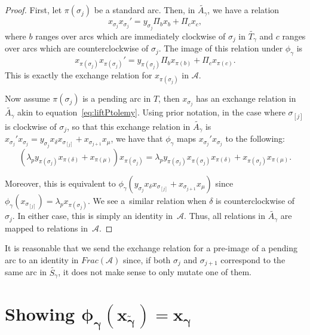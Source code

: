 \documentclass[pdftex]{sigma}%
\numberwithin{equation}{section}
\begin{document}
\begin{proof}
First, let $\pi(\sigma_j)$ be a standard arc. Then, in $\widetilde{A_\gamma}$, we have a relation \begin{equation}\label{eq:liftPtolemy}
x_{\sigma_j}x_{\sigma_j}' = y_{\sigma_j} \Pi_b x_b + \Pi_c x_c, \end{equation} where $b$ ranges over arcs which are immediately clockwise of $\sigma_j$ in $\widetilde{T_\gamma}$ and $c$ ranges over arcs which are counterclockwise of $\sigma_j$. The image of this relation under $\phi_\gamma$ is \begin{equation}
x_{\pi(\sigma_j)}x_{\pi(\sigma_j)}' = y_{\pi(\sigma_j)}\Pi_b x_{\pi(b)} + \Pi_c x_{\pi(c)}.\end{equation} This is exactly the exchange relation for $x_{\pi(\sigma_j)}$ in $\mathcal{A}$.

 Now assume $\pi(\sigma_j)$ is a pending arc in $T$, then $x_{\sigma_j}$ has an exchange relation in $\widetilde{A_\gamma}$ akin to equation~\eqref{eq:liftPtolemy}. Using prior notation, in the case where $\sigma_{[j]}$ is clockwise of $\sigma_j$, so that this exchange relation in $\widetilde{A_\gamma}$ is $x_{\sigma_j}' x_{\sigma_j} = y_{\sigma_j} x_\delta x_{\sigma_{[j]}} + x_{\sigma_{j+1}} x_\mu$, we have that $\phi_\gamma$ maps $x_{\sigma_j}' x_{\sigma_j} $ to the following:\[
 ( \lambda_p y_{\pi(\sigma_j)} x_{\pi(\delta)} + x_{\pi(\mu)}) x_{\pi(\sigma_j)}= \lambda_p y_{\pi(\sigma_j)} x_{\pi(\sigma_j)}x_{\pi(\delta)} + x_{\pi(\sigma_j)} x_{\pi(\mu)}.
\]

Moreover, this is equivalent to $\phi_\gamma( y_{\sigma_j} x_\delta x_{\sigma_{[j]}} + x_{\sigma_{j+1}} x_\mu)$ since $\phi_\gamma(x_{\sigma_{[j]}}) = \lambda_p x_{\pi(\sigma_j)}$.
We see a~similar relation when $\delta$ is counterclockwise of~$\sigma_j$. In either case, this is simply an identity in~$\mathcal{A}$. Thus, all relations in $\widetilde{A_\gamma}$ are mapped to relations in~$\mathcal{A}$.
\end{proof}

\begin{Remark} It is reasonable that we send the exchange relation for a pre-image of a pending arc to an identity in $Frac(\mathcal{A})$ since, if both $\sigma_j$ and $\sigma_{j+1}$ correspond to the same arc in $\widetilde{S_\gamma}$, it does not make sense to only mutate one of them.
\end{Remark}

\section[Showing $\phi_\gamma(x_{\widetilde{\gamma}}) = x_\gamma$]{Showing $\boldsymbol{\phi_\gamma(x_{\widetilde{\gamma}}) = x_\gamma}$}\label{sec:mapClusterVar}
\end{document}
